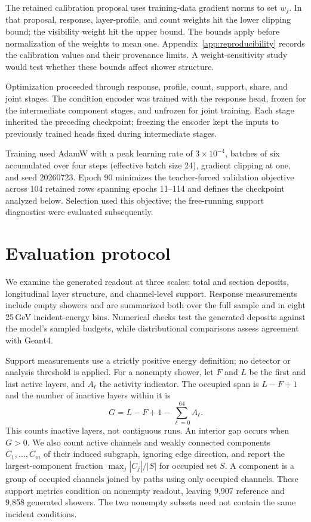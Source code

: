 \documentclass[11pt]{article}
\begin{document}
The retained calibration proposal uses training-data gradient norms to set $w_j$. In that proposal, response, layer-profile, and count weights hit the lower clipping bound; the visibility weight hit the upper bound. The bounds apply before normalization of the weights to mean one. Appendix~\ref{app:reproducibility} records the calibration values and their provenance limits. A weight-sensitivity study would test whether these bounds affect shower structure.

Optimization proceeded through response, profile, count, support, share, and joint stages. The condition encoder was trained with the response head, frozen for the intermediate component stages, and unfrozen for joint training. Each stage inherited the preceding checkpoint; freezing the encoder kept the inputs to previously trained heads fixed during intermediate stages.

Training used AdamW with a peak learning rate of $3\times10^{-4}$, batches of six accumulated over four steps (effective batch size 24), gradient clipping at one, and seed 20260723. Epoch 90 minimizes the teacher-forced validation objective across 104 retained rows spanning epochs 11--114 and defines the checkpoint analyzed below. Selection used this objective; the free-running support diagnostics were evaluated subsequently.

\section{Evaluation protocol}
\label{sec:diagnostics}

We examine the generated readout at three scales: total and section deposits, longitudinal layer structure, and channel-level support. Response measurements include empty showers and are summarized both over the full sample and in eight 25\,GeV incident-energy bins. Numerical checks test the generated deposits against the model's sampled budgets, while distributional comparisons assess agreement with Geant4.

Support measurements use a strictly positive energy definition; no detector or analysis threshold is applied. For a nonempty shower, let $F$ and $L$ be the first and last active layers, and $A_\ell$ the activity indicator. The occupied span is $L-F+1$ and the number of inactive layers within it is
\begin{equation}
 G=L-F+1-\sum_{\ell=0}^{64}A_\ell.
 \label{eq:gaps}
\end{equation}
This counts inactive layers, not contiguous runs. An interior gap occurs when $G>0$. We also count active channels and weakly connected components $C_1,\ldots,C_m$ of their induced subgraph, ignoring edge direction, and report the largest-component fraction $\max_j|C_j|/|S|$ for occupied set $S$. A component is a group of occupied channels joined by paths using only occupied channels. These support metrics condition on nonempty readout, leaving 9,907 reference and 9,858 generated showers. The two nonempty subsets need not contain the same incident conditions.
\end{document}

